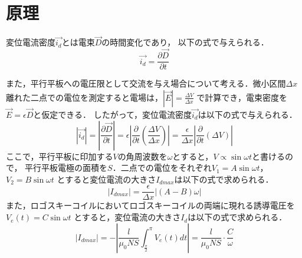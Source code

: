 
\section{原理}

変位電流密度$\vec{i_d}$とは電束$\vec{D}$の時間変化であり，
以下の式で与えられる．
$$
\vec{i_d}=\frac{\partial\vec{D}}{\partial t}
$$

また，平行平板への電圧限として交流を与え場合について考える．微小区間$\Delta x$
離れた二点での電位を測定すると電場は，$|\vec{E}|=\frac{\Delta V}{\Delta x}$
で計算でき，電束密度を$\vec{E}=\epsilon\vec{D}$と仮定できる．
したがって，変位電流密度$\vec{i_d}$は以下の式で与えられる．
$$
|\vec{i_d}|=|\frac{\partial\vec{D}}{\partial t}|=\epsilon|\frac{\partial}{\partial t}(\frac{\Delta V}{\Delta x})|=\frac{\epsilon}{\Delta x}|\frac{\partial}{\partial t}(\Delta V)|
$$
ここで，平行平板に印加する$V$の角周波数を$\omega$とすると，$V\propto \sin \omega t$と書けるので，
平行平板電極の面積を$S$．二点での電位をそれぞれ$V_1 = A\sin \omega t$，$V_2=B\sin \omega t$
とすると変位電流の大きさ$I_{dmax}$は以下の式で求められる．
$$
|I_{dmax}|=\frac{\epsilon}{\Delta x}|(A-B)\omega|
$$
また，ロゴスキーコイルにおいてロゴスキーコイルの両端に現れる誘導電圧を$V_e(t)=C\sin \omega t$
とすると，変位電流の大きさ$I_d$は以下の式で求められる．
$$
|I_{dmax}|=-|\frac{l}{\mu_0 NS}\int_{\frac{\pi}{2}}^{\pi}V_e(t)dt|=\frac{l}{\mu_0 NS}\cdot\frac{C}{\omega}
$$
